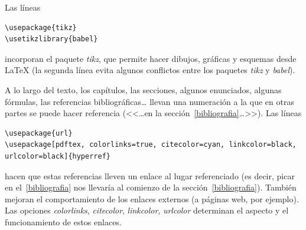 \documentclass[11pt]{book}
\theoremstyle{plain} %
\theoremstyle{definition} %
\begin{document}
Las líneas
\begin{verbatim}
\usepackage{tikz}
\usetikzlibrary{babel}
\end{verbatim}
incorporan el paquete \emph{tikz}, que permite hacer dibujos, gráficas y 
esquemas desde {\LaTeX} (la segunda línea evita algunos conflictos entre los paquetes \emph{tikz} y \emph{babel}).

A lo largo del texto, los capítulos, las secciones, algunos enunciados, algunas 
fórmulas, las referencias bibliográficas{\dots} llevan una numeración a la que en 
otras partes se puede hacer referencia (<<\dots en la 
sección~\ref{bibliografia}\dots>>). Las líneas
\begin{verbatim}
\usepackage{url}
\usepackage[pdftex, colorlinks=true, citecolor=cyan, linkcolor=black, 
urlcolor=black]{hyperref}
\end{verbatim}
hacen que estas referencias lleven un enlace al lugar referenciado 
(es decir, picar en el~\ref{bibliografia} nos llevaría al comienzo de la 
sección~\ref{bibliografia}). También mejoran el comportamiento de los enlaces 
externos (a páginas web, por ejemplo). Las opciones \emph{colorlinks}, 
\emph{citecolor}, \emph{linkcolor}, \emph{urlcolor} determinan el aspecto y el 
funcionamiento de estos enlaces.
\end{document}

